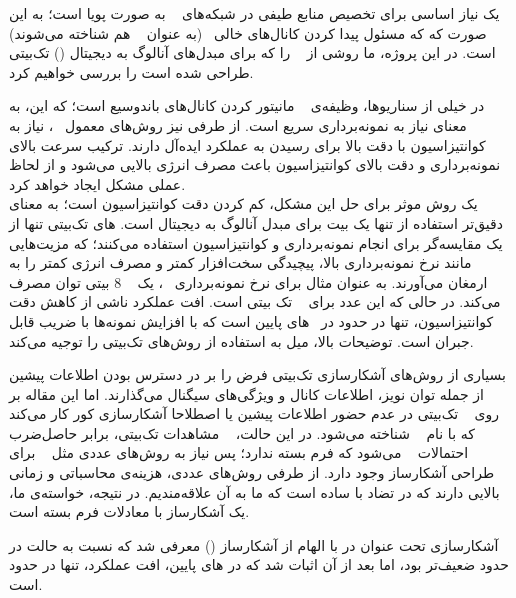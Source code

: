 

 یک نیاز اساسی برای تخصیص منابع طیفی در شبکه‌های \  به صورت پویا است؛ 
به این صورت که که مسئول پیدا کردن کانال‌های خالی \ (به عنوان \  هم شناخته می‌شوند)
است.
در این پروژه، ما روشی از \ 
را که برای مبدل‌های آنالوگ به دیجیتال () تک‌بیتی طراحی شده است را بررسی خواهیم کرد.


در خیلی از سناریوها، وظیفه‌ی \  مانیتور کردن کانال‌های باندوسیع است؛
که این، به معنای نیاز به نمونه‌برداری سریع است. از طرفی نیز روش‌های معمول \ ،
نیاز به کوانتیزاسیون با دقت بالا برای رسیدن به عملکرد ایده‌آل دارند.
ترکیب سرعت بالای نمونه‌برداری و دقت بالای کوانتیزاسیون باعث مصرف انرژی بالایی می‌شود
و از لحاظ عملی مشکل ایجاد خواهد کرد. \\
یک روش موثر برای حل این مشکل، کم کردن دقت کوانتیزاسیون است؛ به معنای دقیق‌تر
استفاده از تنها یک بیت برای مبدل آنالوگ به دیجیتال است.
های تک‌بیتی تنها از یک مقایسه‌گر برای انجام نمونه‌برداری و کوانتیزاسیون استفاده می‌کنند؛ که
مزیت‌هایی مانند نرخ نمونه‌برداری بالا، پیچیدگی سخت‌افزار کمتر و مصرف انرژی کمتر را به ارمغان می‌آورند.
به عنوان مثال برای نرخ نمونه‌برداری \ ، یک \  8 بیتی 
توان مصرف می‌کند. در حالی که این عدد برای \  تک بیتی
است.
افت عملکرد ناشی از کاهش دقت کوانتیزاسیون، تنها در حدود 
در \ های پایین است که با افزایش نمونه‌ها با ضریب 
 قابل جبران است.
توضیحات بالا، میل به استفاده از روش‌های تک‌بیتی را توجیه می‌کند.


بسیاری از روش‌های آشکارسازی تک‌بیتی فرض را بر در دسترس بودن اطلاعات پیشین از جمله توان نویز،
اطلاعات کانال و ویژگی‌های سیگنال می‌گذارند.
اما این مقاله بر روی \  تک‌بیتی در عدم حضور اطلاعات پیشین
یا اصطلاحا آشکارسازی کور کار می‌کند که با نام \  شناخته می‌شود. در این حالت، \  مشاهدات تک‌بیتی، برابر حاصل‌ضرب احتمالات \  می‌شود که فرم بسته ندارد؛ پس نیاز به روش‌های عددی مثل \  برای طراحی آشکارساز وجود دارد. از طرفی روش‌های عددی، هزینه‌ی محاسباتی و زمانی بالایی دارند که در تضاد با  ساده است که ما به آن علاقه‌مندیم. در نتیجه، خواسته‌ی ما، یک آشکارساز با معادلات فرم بسته است.

آشکارسازی تحت عنوان  در  با الهام از آشکارساز   
()
 معرفی شد که نسبت به حالت 
\lr{$\infty$}
در حدود  ضعیف‌تر بود، اما بعد از آن اثبات شد که در های پایین، افت عملکرد، تنها در حدود  است.

